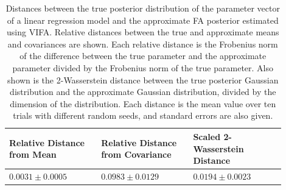 \documentclass[msc,deptreport.inf]{infthesis} %
\begin{document}
\begin{table}[h!]
	\begin{center}
		\begin{tabular}{|| p{0.3\linewidth} p{0.3\linewidth} p{0.3\linewidth} ||} 
 			\hline
 			Relative Distance from Mean & Relative Distance from Covariance & Scaled 2-Wasserstein Distance \\ [0.5ex] 
 			\hline\hline
			$0.0031 \pm 0.0005$ 	& $0.0983 \pm 0.0129$ 	& $0.0194 \pm 0.0023$ \\ [1ex] 
			\hline
		\end{tabular}
		\caption{Distances between the true posterior distribution of the parameter vector of a linear regression model and the approximate FA posterior estimated using VIFA. Relative distances between the true and approximate means and covariances are shown. Each relative distance is the Frobenius norm of the difference between the true parameter and the approximate parameter divided by the Frobenius norm of the true parameter. Also shown is the 2-Wasserstein distance between the true posterior Gaussian distribution and the approximate Gaussian distribution, divided by the dimension of the distribution. Each distance is the mean value over ten trials with different random seeds, and standard errors are also given.}
		\label{table:linear_regression_vi_posterior}
	\end{center}
\end{table}
\end{document}
